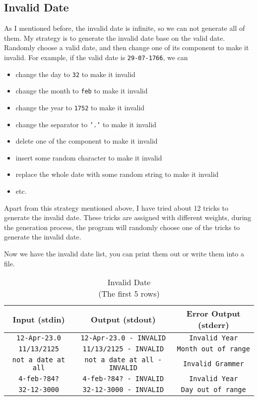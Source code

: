 \documentclass[a4paper,12pt]{article} %
\begin{document}
\subsection*{Invalid Date}

As I mentioned before, the invalid date is infinite, 
so we can not generate all of them.
My strategy is to generate the invalid date base on the valid date. 
Randomly choose a valid date, and then change one of its component to make it invalid.
For example, if the valid date is \texttt{29-07-1766}, we can

\begin{itemize}
    \item change the day to \texttt{32} to make it invalid
    \item change the month to \texttt{feb} to make it invalid
    \item change the year to \texttt{1752} to make it invalid
    \item change the separator to \texttt{'.'} to make it invalid
    \item delete one of the component to make it invalid
    \item insert some random character to make it invalid
    \item replace the whole date with some random string to make it invalid
    \item etc.
\end{itemize}

\newpage

Apart from this strategy mentioned above, 
I have tried about 12 tricks to generate the invalid date. 
These tricks are assigned with different weights, during the generation process, 
the program will randomly choose one of the tricks to generate the invalid date.


Now we have the invalid date list, you can print them out or write them into a file. 

\begin{table}[h]
    \centering
    \caption{Invalid Date \\ (The first 5 rows)}
    \begin{tabular}{|c|c|c|}
        \hline
        \textbf{Input (stdin)} & \textbf{Output (stdout)} & \textbf{Error Output (stderr)} \\
        \hline
        \texttt {12-Apr-23.0} & \texttt {12-Apr-23.0 - INVALID} & \texttt {Invalid Year} \\
        \texttt {11/13/2125} & \texttt {11/13/2125 - INVALID} & \texttt {Month out of range} \\
        \texttt {not a date at all} & \texttt {not a date at all - INVALID} & \texttt {Invalid Grammer} \\
        \texttt {4-feb-?84?} & \texttt {4-feb-?84? - INVALID} & \texttt {Invalid Year} \\
        \texttt {32-12-3000} & \texttt {32-12-3000 - INVALID} & \texttt {Day out of range} \\
        \hline
    \end{tabular}
\end{table}
\end{document}

